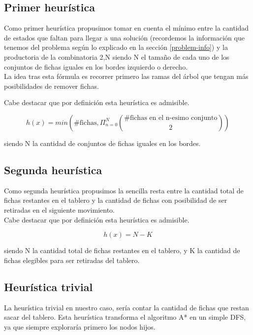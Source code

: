 \documentclass[a4paper,10pt]{article}
\begin{document}
    \subsection{Primer heurística}
    
    Como primer heurística propusimos tomar en cuenta el mínimo entre la cantidad de estados que faltan para llegar a una solución (recordemos la información que tenemos del 
    problema según lo explicado en la sección \ref{problem-info}) y la productoria de la combinatoria 2,N 
    siendo N el tamaño de cada uno de los conjuntos de fichas iguales en los bordes izquierdo o derecho.\\

    La idea tras esta fórmula es recorrer primero las ramas del árbol que tengan más posibilidades de remover fichas.

    Cabe destacar que por definición esta heurística es admisible.


    \[ h(x) = min(\text{\# fichas}, \Pi_{n=0}^{N} { \text{\# fichas en el n-esimo conjunto} \choose 2} )\] 

    siendo N la cantidad de conjuntos de fichas iguales en los bordes.
    
    \subsection{Segunda heurística}

    Como segunda heurística propusimos la sencilla resta entre la cantidad total de fichas restantes en el tablero y la cantidad de fichas con posibilidad de ser retiradas en el
    siguiente movimiento.\\

    Cabe destacar que por definición esta heurística es admisible.

     \[ h(x) = N - K\] 

    siendo N la cantidad total de fichas restantes en el tablero, y K la cantidad de fichas elegibles para ser retiradas del tablero.

    \subsection{Heurística trivial}

    La heurística trivial en nuestro caso, sería contar la cantidad de fichas que restan sacar del tablero. Esta heurística transforma el algoritmo A* en un simple DFS, ya que siempre 
    exploraría primero los nodos hijos.
\end{document}
